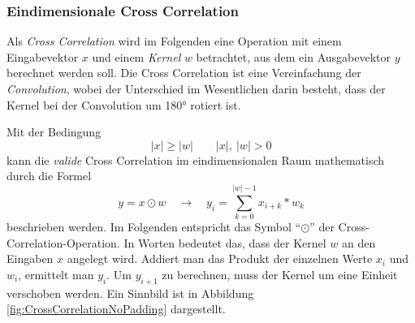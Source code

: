 \documentclass[12pt,a4]{article}
\begin{document}
\subsubsection{Eindimensionale Cross Correlation}\label{sec:CrossCorrelation1D}
Als \textit{Cross Correlation} wird im Folgenden eine Operation mit einem Eingabevektor $x$ und einem \textit{Kernel} $w$ betrachtet, aus dem ein Ausgabevektor $y$ berechnet werden soll. Die Cross Correlation ist eine Vereinfachung der \textit{Convolution}, wobei der Unterschied im Wesentlichen darin besteht, dass der Kernel bei der Convolution um 180° rotiert ist.

Mit der Bedingung
\[
|x| \geq |w| \qquad |x|, \: |w| > 0
\]
kann die \textit{valide} Cross Correlation im eindimensionalen Raum mathematisch durch die Formel
\begin{equation}
y = x \odot w \quad \rightarrow \quad y_i = \sum\limits_{k=0}^{|w| - 1} x_{i+k} * w_{k}
\end{equation}
beschrieben werden. Im Folgenden entspricht das Symbol \enquote{$\odot$} der Cross-Correlation-Operation. In Worten bedeutet das, dass der Kernel $w$ an den Eingaben $x$ angelegt wird. Addiert man das Produkt der einzelnen Werte $x_i$ und $w_i$, ermittelt man $y_i$. Um $y_{i+1}$ zu berechnen, muss der Kernel um eine Einheit verschoben werden. Ein Sinnbild ist in Abbildung \ref{fig:CrossCorrelationNoPadding} dargestellt.
\end{document}
